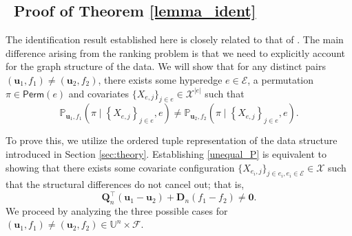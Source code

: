 \documentclass[
  12pt]{article}
\begin{document}
\subsection{~Proof of Theorem \ref{lemma_ident}}\label{proof:ind}

The identification result established here is closely related to that of \cite{matzkin1991semiparametric}. The main difference arising from the ranking problem is that we need to explicitly account for the graph structure of the data.
We will show that for any distinct pairs $(\boldsymbol{u}_1,f_1)\neq (\boldsymbol{u}_2,f_2)$, there exists some hyperedge $e \in \mathcal{E}$, a permutation $\pi \in \mathsf{Perm}(e)$ and covariates $\{X_{e, j}\}_{j \in e} \in \mathcal{X}^{|e|}$ such that
 \begin{equation}
 \label{unequal_P}
     \mathbb{P}_{\boldsymbol{u}_1,f_1}\left(\pi \mid\left\{X_{e, j}\right\}_{j \in e},e\right) \neq \mathbb{P}_{\boldsymbol{u}_2,f_2}\left(\pi \mid\left\{X_{e, j}\right\}_{j \in e},e\right).
 \end{equation}


    \noindent To prove this, we utilize the ordered tuple representation of the data structure introduced in Section \ref{sec:theory}. Establishing \eqref{unequal_P} is equivalent to showing that there exists some covariate configuration \(\{X_{e_i, j}\}_{j \in e_i, e_i \in \mathcal{E}} \in \mathcal{X}\) such that the structural differences do not cancel out; that is,
\begin{equation}
\label{unequal}
    \boldsymbol{Q}_n^\top(\boldsymbol{u}_1-\boldsymbol{u}_2)+\boldsymbol{D}_n(f_1-f_2) \neq \boldsymbol{0}.
\end{equation}
\noindent We proceed by analyzing the three possible cases for $(\boldsymbol{u}_1,f_1)\neq (\boldsymbol{u}_2,f_2) \in \mathbb{U}^n \times \mathcal{F}$.
\end{document}
